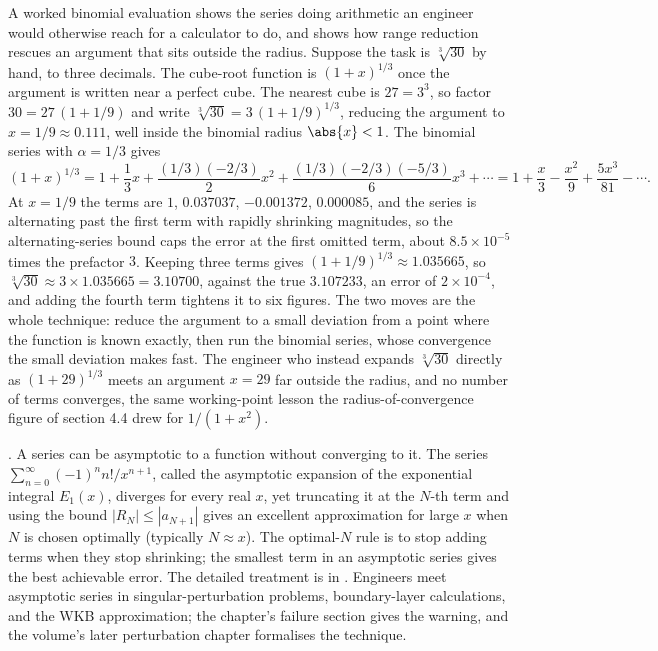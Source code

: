 A worked binomial evaluation shows the series doing arithmetic an engineer
would otherwise reach for a calculator to do, and shows how range
reduction rescues an argument that sits outside the radius. Suppose the
task is $\sqrt[3]{30}$ by hand, to three decimals. The cube-root function
is $(1 + x)^{1/3}$ once the argument is written near a perfect cube. The
nearest cube is $27 = 3^{3}$, so factor $30 = 27\,(1 + 1/9)$ and write
$\sqrt[3]{30} = 3\,(1 + 1/9)^{1/3}$, reducing the argument to $x = 1/9
\approx 0.111$, well inside the binomial radius $\abs{x} < 1$. The
binomial series with $\alpha = 1/3$ gives
\[
(1 + x)^{1/3} = 1 + \frac{1}{3}x + \frac{(1/3)(-2/3)}{2}x^{2} +
\frac{(1/3)(-2/3)(-5/3)}{6}x^{3} + \cdots = 1 + \frac{x}{3} -
\frac{x^{2}}{9} + \frac{5 x^{3}}{81} - \cdots.
\]
At $x = 1/9$ the terms are $1$, $0.037037$, $-0.001372$, $0.000085$, and
the series is alternating past the first term with rapidly shrinking
magnitudes, so the alternating-series bound caps the error at the first
omitted term, about $8.5 \times 10^{-5}$ times the prefactor $3$. Keeping
three terms gives $(1 + 1/9)^{1/3} \approx 1.035665$, so $\sqrt[3]{30}
\approx 3 \times 1.035665 = 3.10700$, against the true $3.107233$, an
error of $2 \times 10^{-4}$, and adding the fourth term tightens it to
six figures. The two moves are the whole technique: reduce the argument to
a small deviation from a point where the function is known exactly, then
run the binomial series, whose convergence the small deviation makes fast.
The engineer who instead expands $\sqrt[3]{30}$ directly as
$(1 + 29)^{1/3}$ meets an argument $x = 29$ far outside the radius, and no
number of terms converges, the same working-point lesson the
radius-of-convergence figure of section 4.4 drew for $1/(1 + x^{2})$.

\begin{mastery}
. A series can be
asymptotic to a function without converging to it. The series
$\sum_{n=0}^{\infty} (-1)^{n} n! / x^{n+1}$, called the asymptotic
expansion of the exponential integral $E_{1}(x)$, diverges for every
real $x$, yet truncating it at the $N$-th term and using the bound
$|R_{N}| \leq |a_{N+1}|$ gives an excellent approximation for large
$x$ when $N$ is chosen optimally (typically $N \approx x$). The
optimal-$N$ rule is to stop adding terms when they stop shrinking;
the smallest term in an asymptotic series gives the best achievable
error. The detailed treatment is in
\cite{text:v2ch04-bender-orszag-1999}. Engineers meet asymptotic
series in singular-perturbation problems, boundary-layer
calculations, and the WKB approximation; the chapter's failure
section gives the warning, and the volume's later perturbation
chapter formalises the technique.
\end{mastery}

